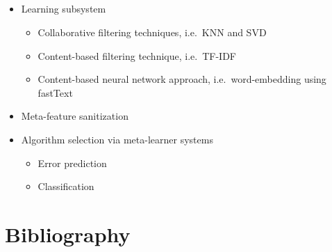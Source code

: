 \documentclass[aspectratio=169]{beamer}
\begin{document}
\subsection{\inserttitle}
\begin{frame}
	\frametitle{\insertsection}
	\framesubtitle{\insertsubsection}

	\begin{itemize}
		\item Learning subsystem
		\begin{itemize}
			\item Collaborative filtering techniques, i.e.~KNN and SVD
			\item Content-based filtering technique, i.e.~TF-IDF
			\item Content-based neural network approach, i.e.~word-embedding using fastText
		\end{itemize}
		\item Meta-feature sanitization
		\item Algorithm selection via meta-learner systems
		\begin{itemize}
			\item Error prediction
			\item Classification
		\end{itemize}
	\end{itemize}
\end{frame}

\appendix

\section*{Bibliography}
\begin{frame}[shrink=20]
	\frametitle{\insertsection}

	\printbibliography%
\end{frame}
\end{document}
